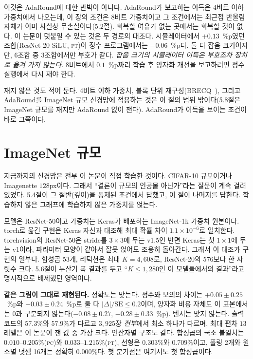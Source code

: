 \documentclass[11pt,a4paper,oneside]{report}
\newcommand{\fittable}[1]{\adjustbox{max width=\textwidth}{#1}}
\begin{document}
이것은 AdaRound에 대한 반박이 아니다. AdaRound가 보고하는 이득은 4비트 이하 가중치에서 나오는데, 이 장의
조건은 8비트 가중치이고 그 조건에서는 최근접 반올림 자체가 이미 사실상 무손실이다(5.2절). 회복할 여유가
없는 곳에서는 회복할 것이 없다. 이 논문이 덧붙일 수 있는 것은 두 경로의 대조다. 시뮬레이터에서
$+0.13$~\%p였던 조합(ResNet-20 SiLU, \textsc{pt})이 정수 프로그램에서는 $-0.06$~\%p다. 둘 다 잡음
크기이지만, 6조합 중 3조합에서만 부호가 같다. \emph{잡음 크기의 시뮬레이터 이득은 부호조차 장치로 옮겨
가지 않는다.} 8비트에서 $0.1$~\%p짜리 학습 후 양자화 개선을 보고하려면 정수 실행에서 다시 재야 한다.

재지 않은 것도 적어 둔다. 4비트 이하 가중치, 블록 단위 재구성(BRECQ~\cite{brecq}), 그리고 AdaRound를
ImageNet 규모 신경망에 적용하는 것은 이 절의 범위 밖이다(5.8절은 ImageNet 규모를 재지만 AdaRound 없이
잰다). AdaRound가 이득을 보이는 조건이 바로 그쪽이다.

\section{ImageNet 규모}
\label{sec:imagenet}

지금까지의 신경망은 전부 이 논문이 직접 학습한 것이다. CIFAR-10 규모이거나 Imagenette $128$px이다. 그래서
``결론이 규모의 인공물 아닌가''라는 질문이 계속 걸려 있었다. 5.4절이 그 절반(깊이)을 통제된 조건에서 답했고,
이 절이 나머지를 답한다. 학습하지 않은 그래프에 학습하지 않은 가중치를 얹는다.

모델은 ResNet-50이고 가중치는 Keras가 배포하는 ImageNet-1k 가중치 원본이다. torch로 옮긴 구현은 Keras 자신과
대조해 최대 확률 차이 $1.1\times10^{-6}$로 일치한다. torchvision의 ResNet-50은 stride를 $3\times3$에 두는
v1.5인 반면 Keras는 첫 $1\times1$에 두는 v1이라, 파라미터 모양이 같아서 잘못 얹어도 조용히 돌아간다. 그래서
이 대조가 구현의 일부다. 합성곱 $53$개, 리덕션은 최대 $K = 4{,}608$로, ResNet-20의 $576$보다 한 자릿수 크다.
5.6절이 누산기 폭 결과를 두고 ``$K \le 1{,}280$인 이 모델들에서의 결과''라고 명시적으로 배제했던 영역이다.

\begin{table}[!t]
\caption[ImageNet 규모 대조]{ImageNet 규모에서의 모의 대 정수. ResNet-50(Keras의 ImageNet 가중치), 이미지
$3{,}925$장, $1000$-way 헤드. $\Delta$는 같은 이미지에서의 쌍 차이 $\pm$ 쌍 표준오차, ``코드''는 다른
출력 코드의 비율, $\max|\Delta c|$는 최대 편차다.}
\label{tab:imagenet}
\centering
\small
\fittable{}
\end{table}

\textbf{같은 그림이 그대로 재현된다.} 정확도는 맞는다. 정수와 모의의 차이는 $+0.05 \pm 0.25$~\%p와
$-0.03 \pm 0.24$~\%p로 둘 다 $|\Delta|/\mathrm{SE} \le 0.2$이며, 양자화 비용 자체도 이 표본에서는 0과
구분되지 않는다($-0.08 \pm 0.27$, $-0.28 \pm 0.33$~\%p). 텐서는 맞지 않는다. 출력 코드의 $57.3\%$와
$57.9\%$가 다르고 $3{,}925$장 \emph{전부}에서 최소 하나가 다르며, 최대 편차 $13$레벨은 이 논문이 잰 값 중
가장 크다. 연산자별 구조도 같다. 합성곱의 국소 불일치는 $0.010$--$0.205\%$(\textsc{pc})와
$0.033$--$1.215\%$(\textsc{pt}), 선형은 $0.303\%$와 $0.709\%$이고, 풀링 2개와 원소별 덧셈 16개는 정확히
$0.000\%$다. 첫 분기점은 여기서도 첫 합성곱이다.
\end{document}
